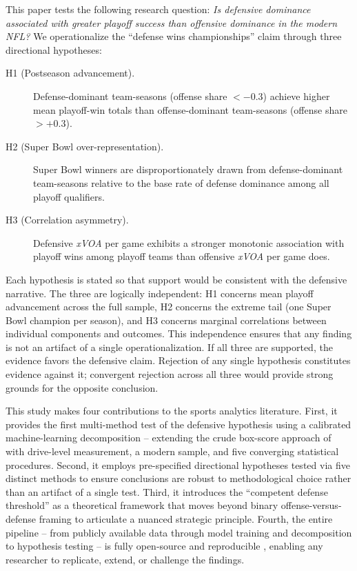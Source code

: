 \documentclass[12pt,a4paper]{article}
\newcommand{\xvoa}{\textit{xVOA}}
\begin{document}
This paper tests the following research question: \emph{Is defensive dominance associated with greater playoff success than offensive dominance in the modern NFL?} We operationalize the ``defense wins championships'' claim through three directional hypotheses:

\begin{description}
  \item[H1 (Postseason advancement).] Defense-dominant team-seasons (offense share $< -0.3$) achieve higher mean playoff-win totals than offense-dominant team-seasons (offense share $> +0.3$).
  \item[H2 (Super Bowl over-representation).] Super Bowl winners are disproportionately drawn from defense-dominant team-seasons relative to the base rate of defense dominance among all playoff qualifiers.
  \item[H3 (Correlation asymmetry).] Defensive \xvoa{} per game exhibits a stronger monotonic association with playoff wins among playoff teams than offensive \xvoa{} per game does.
\end{description}

Each hypothesis is stated so that support would be consistent with the defensive narrative. The three are logically independent: H1 concerns mean playoff advancement across the full sample, H2 concerns the extreme tail (one Super Bowl champion per season), and H3 concerns marginal correlations between individual components and outcomes. This independence ensures that any finding is not an artifact of a single operationalization. If all three are supported, the evidence favors the defensive claim. Rejection of any single hypothesis constitutes evidence against it; convergent rejection across all three would provide strong grounds for the opposite conclusion.

This study makes four contributions to the sports analytics literature. First, it provides the first multi-method test of the defensive hypothesis using a calibrated machine-learning decomposition -- extending the crude box-score approach of \citet{robst2011defense} with drive-level measurement, a modern sample, and five converging statistical procedures. Second, it employs pre-specified directional hypotheses tested via five distinct methods to ensure conclusions are robust to methodological choice rather than an artifact of a single test. Third, it introduces the ``competent defense threshold'' as a theoretical framework that moves beyond binary offense-versus-defense framing to articulate a nuanced strategic principle. Fourth, the entire pipeline -- from publicly available data through model training and decomposition to hypothesis testing -- is fully open-source and reproducible \citep{carl2021nflfastr}, enabling any researcher to replicate, extend, or challenge the findings.
\end{document}
